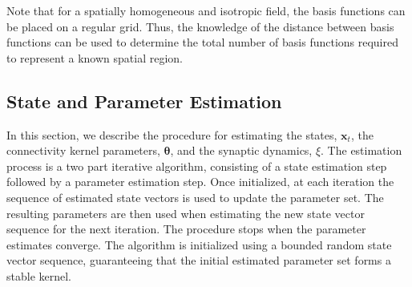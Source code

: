 \documentclass[review,authoryear,3p]{elsarticle}
\begin{document}
Note that for a spatially homogeneous and isotropic field, the basis functions can be placed on a regular grid. Thus, the knowledge of the distance between basis functions can be used to determine the total number of basis functions required to represent a known spatial region.

\subsection{State and Parameter Estimation}\label{StateAndParameterEstimationSection} In this section, we describe the procedure for estimating the states, $\mathbf{x}_t$, the connectivity kernel parameters, $\boldsymbol \theta$, and the synaptic dynamics, $\xi$. The estimation process is a two part iterative algorithm, consisting of a state estimation step followed by a parameter estimation step. Once initialized, at each iteration the sequence of estimated state vectors is used to update the parameter set. The resulting parameters are then used when estimating the new state vector sequence for the next iteration. The procedure stops when the parameter estimates converge. The algorithm is initialized using a bounded random state vector sequence, guaranteeing that the initial estimated parameter set forms a stable kernel.
\end{document}
